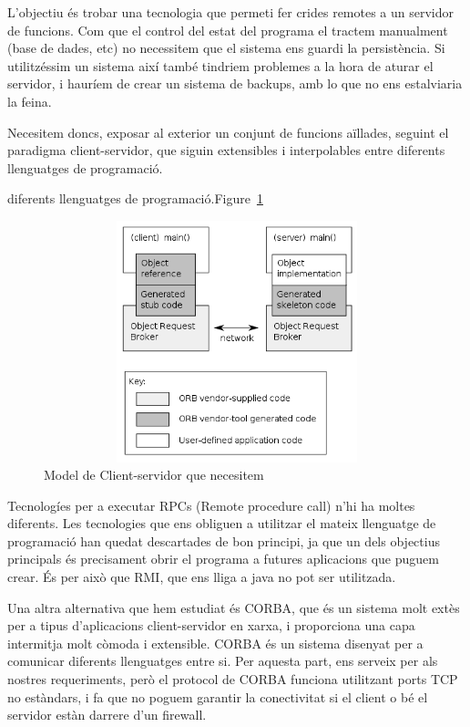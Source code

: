 	   L'objectiu és trobar una tecnologia que permeti fer crides remotes a un servidor
	   de funcions.  Com que el control del estat del programa el tractem manualment
	   (base de dades, etc) no necessitem que el sistema ens guardi la persistència.
	   Si utilitzéssim un sistema així també tindriem problemes a la hora de aturar el
	   servidor, i hauríem de crear un sistema de backups, amb lo que no ens
	   estalviaria la feina.

	   Necesitem doncs, exposar al exterior un conjunt de funcions aïllades, seguint el
	   paradigma client-servidor, que siguin extensibles i interpolables entre
	   diferents llenguatges de programació.

	   diferents llenguatges de programació.Figure~\ref{fig:401px-Orb.png}

	   \begin{figure}[h]
	   \centering
	   \includegraphics[width=13cm,height=7cm]{401px-Orb.png}
	   \caption{Model de Client-servidor que necesitem}
	   \label{fig:401px-Orb.png}
	   \end{figure} 

	   Tecnologíes per a executar RPCs (Remote procedure call) n'hi ha moltes
	   diferents. Les tecnologies que ens obliguen a utilitzar el mateix llenguatge de
programació han quedat descartades de bon principi, ja que un dels objectius
principals és precisament obrir el programa a futures aplicacions que puguem
crear.  És per això que RMI, que ens lliga a java no pot ser utilitzada.  

Una altra alternativa que hem estudiat és CORBA, que és un sistema molt extès
per a tipus d'aplicacions client-servidor en xarxa, i proporciona una capa
intermitja molt còmoda i extensible.  CORBA és un sistema disenyat per a
comunicar diferents llenguatges entre si.  Per aquesta part, ens serveix per als
nostres requeriments, però el protocol de CORBA funciona utilitzant ports TCP
no estàndars, i fa que no poguem garantir la conectivitat si el client o bé el
servidor estàn darrere d'un firewall.

